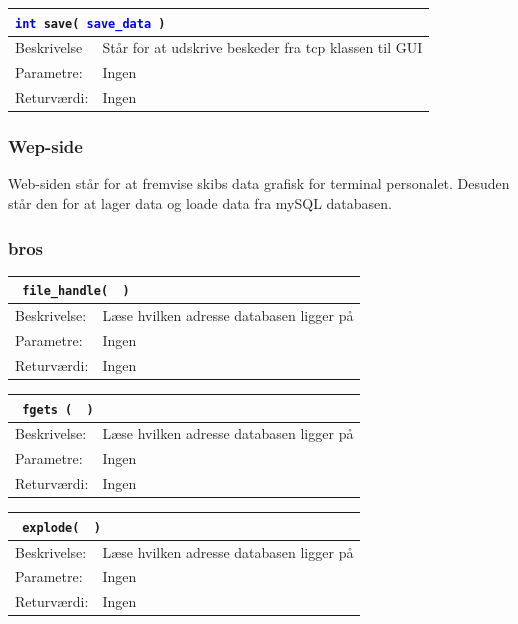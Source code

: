 \begin{table}[H]
\begin{tabular}{l p{12.5cm}}
\multicolumn{2}{l}{\texttt{\textcolor{blue}{int} save( \textcolor{blue}{save\_data} )}} \\
\hline
Beskrivelse & Står for at udskrive beskeder fra tcp klassen til GUI \\
Parametre: & Ingen\\
Returværdi:& Ingen\\
\end{tabular}
\end{table}

\subsubsection{Wep-side}
Web-siden står for at fremvise skibs data grafisk for terminal personalet. Desuden står den for at lager data og loade data fra mySQL databasen.\\

\subsubsection{bros}

\begin{table}[H]
\begin{tabular}{l p{12.5cm}}
\multicolumn{2}{l}{\texttt{\textcolor{blue}{} file\_handle( \textcolor{blue}{} )}} \\
\hline
Beskrivelse:&Læse hvilken adresse databasen ligger på\\
Parametre:& Ingen\\
Returværdi:& Ingen\\
\end{tabular}
\end{table}

\begin{table}[H]
\begin{tabular}{l p{12.5cm}}
\multicolumn{2}{l}{\texttt{\textcolor{blue}{} fgets ( \textcolor{blue}{} )}} \\
\hline
Beskrivelse:&Læse hvilken adresse databasen ligger på\\
Parametre:& Ingen\\
Returværdi:& Ingen\\
\end{tabular}
\end{table}

\begin{table}[H]
\begin{tabular}{l p{12.5cm}}
\multicolumn{2}{l}{\texttt{\textcolor{blue}{} explode( \textcolor{blue}{} )}} \\
\hline
Beskrivelse: &Læse hvilken adresse databasen ligger på\\
Parametre: & Ingen\\
Returværdi: & Ingen\\
\end{tabular}
\end{table}

